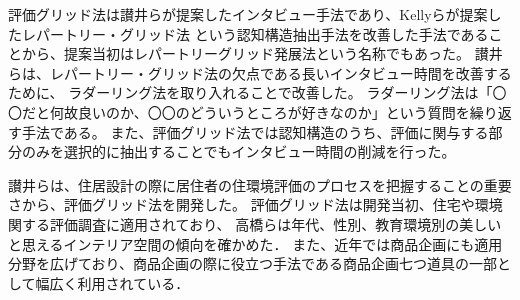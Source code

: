 \documentclass[syuuron]{kuee}
\begin{document}
		評価グリッド法は讃井らが提案したインタビュー手法であり、Kellyらが提案したレパートリー・グリッド法\cite{rg1}
		という認知構造抽出手法を改善した手法であることから、提案当初はレパートリーグリッド発展法という名称でもあった。
		讃井らは、レパートリー・グリッド法の欠点である長いインタビュー時間を改善するために、
		ラダーリング法\cite{rd1}を取り入れることで改善した。
		ラダーリング法は「〇〇だと何故良いのか、〇〇のどういうところが好きなのか」という質問を繰り返す手法である。
		また、評価グリッド法では認知構造のうち、評価に関与する部分のみを選択的に抽出することでもインタビュー時間の削減を行った。
		
		讃井らは、住居設計の際に居住者の住環境評価のプロセスを把握することの重要さから、評価グリッド法を開発した。
		評価グリッド法は開発当初、住宅や環境関する評価調査に適用されており、
		高橋らは年代、性別、教育環境別の美しいと思えるインテリア空間の傾向を確かめた\cite{egm1}．
		また、近年では商品企画にも適用分野を広げており、商品企画の際に役立つ手法である商品企画七つ道具の一部として幅広く利用されている\cite{egm2}．
		
\end{document}

